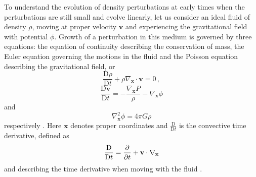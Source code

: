\documentclass[english, twoside]{HYgradu}
\begin{document}
To understand the evolution of density perturbations at early times when the perturbations are still small and evolve linearly, let us consider an ideal fluid of density $\rho$, moving at proper velocity $\mathbf{v}$ and experiencing the gravitational field with potential $\phi$. Growth of a perturbation in this medium is governed by three equations: the equation of continuity describing the conservation of mass, the Euler equation governing the motions in the fluid and the Poisson equation describing the gravitational field, or
\begin{equation}\label{continuity}
\frac{\textrm{D}\rho}{\textrm{D}t} + \rho \nabla_\mathbf{x}\cdot{\mathbf{v}} = 0 \,,
\end{equation}
\begin{equation}\label{euler}
\frac{\textrm{D}\mathbf{v}}{\textrm{D}t} = - \frac{\nabla_\mathbf{x} P}{\rho} - \nabla_\mathbf{x}\phi
\end{equation}
and
\begin{equation}\label{poisson}
\nabla_\mathbf{x}^2\phi = 4\pi G\rho
\end{equation}
respectively \citep{mo2010galaxy}. Here $\mathbf{x}$ denotes proper coordinates and $\frac{\textrm{D}}{\textrm{D}t}$ is the convective time derivative, defined as
\begin{equation}
\frac{\textrm{D}}{\textrm{D}t} = \pdv{}{t} + \mathbf{v}\cdot\nabla_\mathbf{x}
\end{equation}
and describing the time derivative when moving with the fluid \citep{mo2010galaxy}.
\end{document}
